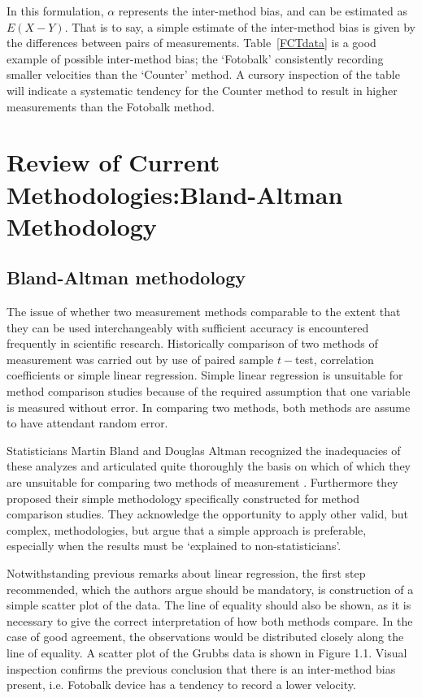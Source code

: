 \documentclass[12pt, a4paper]{report}
\theoremstyle{plain}
\theoremstyle{definition}
\theoremstyle{remark}
\begin{document}
	In this formulation, $\alpha$ represents the inter-method bias, and can be estimated as $E(X-Y)$. That is to say, a simple estimate of the inter-method bias is given by the differences between pairs of measurements.  Table~\ref{FCTdata} is a good example of possible inter-method bias; the `Fotobalk' consistently recording
	smaller velocities than the `Counter' method. A cursory inspection of the table will indicate a systematic tendency for the Counter method to result in higher measurements than the Fotobalk method. %
	
	\newpage

	
	\chapter{Review of Current Methodologies:Bland-Altman Methodology}
	\section{Bland-Altman methodology}
	The issue of whether two measurement methods comparable to the
	extent that they can be used interchangeably with sufficient
	accuracy is encountered frequently in scientific research.
	Historically comparison of two methods of measurement was carried
	out by use of paired sample $t-$test, correlation coefficients or
	simple linear regression. Simple linear regression is unsuitable for method comparison studies because of the required assumption that one variable is measured without error. In comparing two methods, both methods are assume to have attendant random error.
	
	Statisticians Martin Bland and Douglas Altman recognized the inadequacies of these analyzes and
	articulated quite thoroughly the basis on which of which they are unsuitable for comparing two methods of measurement \citep*{BA83}. Furthermore they proposed their simple methodology specifically
	constructed for method comparison studies. They acknowledge the opportunity to apply other valid, but complex, methodologies, but argue that a simple approach is preferable, especially when the
	results must be `explained to non-statisticians'.
	
	Notwithstanding previous remarks about linear regression, the first step recommended, which the authors argue should be mandatory, is construction of a simple scatter plot of the data. The line of equality should also be shown, as it is necessary to give the correct interpretation of how both methods compare. In the case of good agreement, the observations would be distributed closely along the line of equality. A scatter plot of the Grubbs data is shown in Figure 1.1. Visual inspection confirms the previous conclusion that there is an inter-method bias present, i.e. Fotobalk device has a tendency to record a lower velocity.
	
\end{document}
